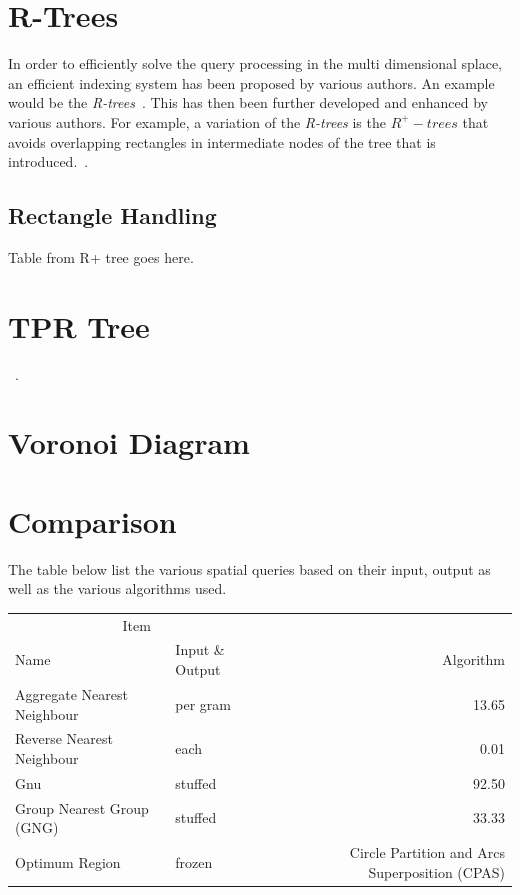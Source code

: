 \documentclass[a4paper,11pt]{article}
\begin{document}
\section{R-Trees} In order to efficiently solve the query processing in the
multi dimensional splace, an efficient indexing system has been proposed by
various authors. An example would be the \textit{R-trees}~\cite{guttman1984r}.
This has then been further developed and enhanced by various authors. For
example, a variation of the \textit{R-trees} is the $R^+ -trees$ that avoids
overlapping rectangles in intermediate nodes of the tree that is
introduced.~\cite{beckmann1990r}.

\subsection{Rectangle Handling}
Table from R+ tree goes here.

\section{TPR\* Tree}
~\cite{tao2003tpr}.

\section{Voronoi Diagram}

\section{Comparison}

The table below list the various spatial queries based on their input, output as well as the various algorithms used.

\begin{tabular}{llr}
\hline
\multicolumn{2}{c}{Item} \\
\cline{1-2}
Name    & Input \& Output & Algorithm \\
\hline
Aggregate Nearest Neighbour      & per gram    & 13.65      \\
Reverse Nearest Neighbour          & each        & 0.01       \\
Gnu       & stuffed     & 92.50      \\
Group Nearest Group (GNG)       & stuffed     & 33.33      \\
Optimum Region & frozen      & Circle Partition and Arcs Superposition (CPAS)       \\
\hline
\end{tabular}



\clearpage


\end{document}
